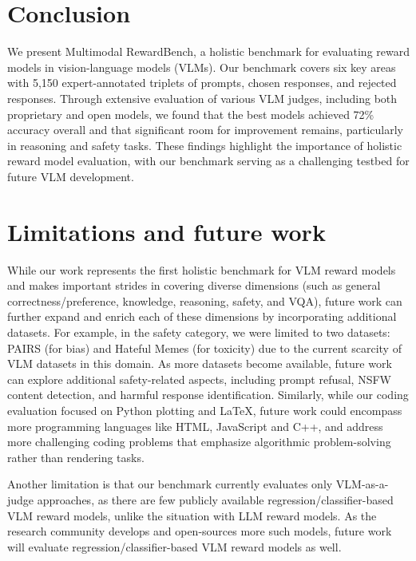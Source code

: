 \section{Conclusion}
We present Multimodal RewardBench, a holistic benchmark for evaluating reward models in vision-language models (VLMs). Our benchmark covers six key areas with 5,150 expert-annotated triplets of prompts, chosen responses, and rejected responses. Through extensive evaluation of various VLM judges, including both proprietary and open models, we found that the best models achieved 72\% accuracy overall and that significant room for improvement remains, particularly in reasoning and safety tasks. These findings highlight the importance of holistic reward model evaluation, with our benchmark serving as a challenging testbed for future VLM development.


 
\section{Limitations and future work}
While our work represents the first holistic benchmark for VLM reward models and makes important strides in covering diverse dimensions (such as general correctness/preference, knowledge, reasoning, safety, and VQA), future work can further expand and enrich each of these dimensions by incorporating additional datasets.
For example, in the safety category, we were limited to two datasets: PAIRS (for bias) and Hateful Memes (for toxicity) due to the current scarcity of VLM datasets in this domain. As more datasets become available, future work can explore additional safety-related aspects, including prompt refusal, NSFW content detection, and harmful response identification. Similarly, while our coding evaluation focused on Python plotting and LaTeX, future work could encompass more programming languages like HTML, JavaScript and C++, and address more challenging coding problems that emphasize algorithmic problem-solving rather than rendering tasks. 

Another limitation is that our benchmark currently evaluates only VLM-as-a-judge approaches, as there are few publicly available regression/classifier-based VLM reward models, unlike the situation with LLM reward models. As the research community develops and open-sources more such models, future work will evaluate regression/classifier-based VLM reward models as well.